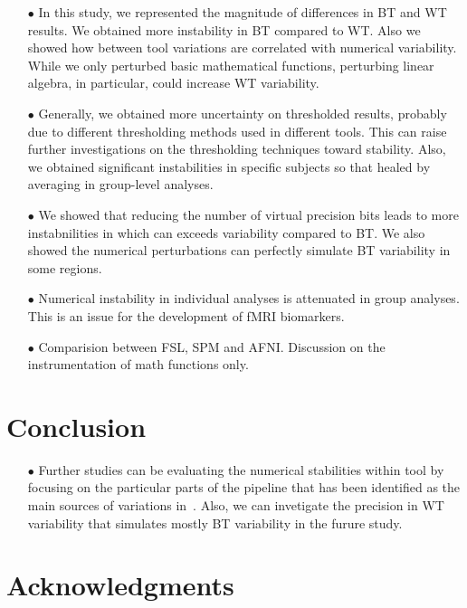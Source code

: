 \documentclass[conference]{IEEEtran}
\begin{document}
\begin{itemize}

  \item[$\bullet$ ] In this study, we represented the magnitude of differences in BT and WT results.
  We obtained more instability in BT compared to WT. Also we showed how between tool variations
  are correlated with numerical variability.
  While we only perturbed basic mathematical functions, perturbing linear algebra, in particular, could increase WT variability.

  \item[$\bullet$ ] Generally, we obtained more uncertainty on thresholded results, probably due to different thresholding
  methods used in different tools. This can raise further investigations on the thresholding techniques toward stability.
  Also, we obtained significant instabilities in specific subjects so that healed by averaging in group-level analyses.

  \item[$\bullet$ ] We showed that reducing the number of virtual precision bits leads to more instabnilities in which can exceeds variability compared to BT.
  We also showed the numerical perturbations can perfectly simulate BT variability in some regions. 
   
  \item[$\bullet$] Numerical instability in individual analyses is attenuated in group analyses. This is an issue for the development of fMRI biomarkers.

  \item[$\bullet$] Comparision between FSL, SPM and AFNI. Discussion on the instrumentation of math functions only.
\end{itemize}


\section{Conclusion}

\begin{itemize}

    \item[$\bullet$ ] Further studies can be evaluating the numerical stabilities within tool by focusing on the particular parts of
    the pipeline that has been identified as the main sources of variations in~\cite{bowring2021isolating}.
    Also, we can invetigate the precision in WT variability that simulates mostly BT variability in the furure study.

\end{itemize}


\section{Acknowledgments}




\end{document}
